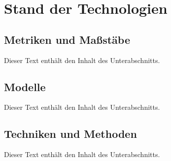 \section{Stand der Technologien}
\label{sec:03_state-of-technology}

\subsection{Metriken und Maßstäbe}
\label{subsec:03-01_metrics-and-benchmarks}

Dieser Text enthält den Inhalt des Unterabschnitts.

\subsection{Modelle}
\label{subsec:03-02_models}

Dieser Text enthält den Inhalt des Unterabschnitts.

\subsection{Techniken und Methoden}
\label{subsec:03-03_techniques-and-methods}

Dieser Text enthält den Inhalt des Unterabschnitts.
